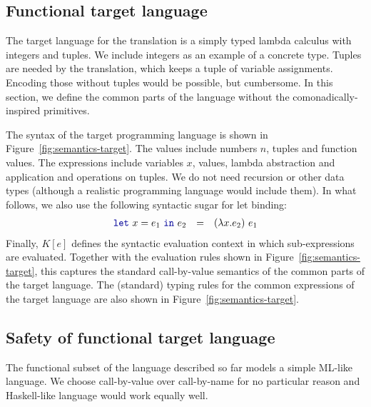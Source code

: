 
\subsection{Functional target language}
\label{sec:semantics-translation-target}

The target language for the translation is a simply typed lambda calculus with integers and tuples.
We include integers as an example of a concrete type. Tuples are needed by the translation, which
keeps a tuple of variable assignments. Encoding those without tuples would be possible, but
cumbersome. In this section, we define the common parts of the language without the
comonadically-inspired primitives.

The syntax of the target programming language is shown in Figure~\ref{fig:semantics-target}.
The values include numbers $n$, tuples and function values. The expressions include variables $x$,
values, lambda abstraction and application and operations on tuples. We do not need recursion or
other data types (although a realistic programming language would include them).
In what follows, we also use the following syntactic sugar for let binding:
%
\begin{equation*}
\begin{array}{rcl}
  \kvd{let}~x=e_1~\kvd{in}~e_2 &=& (\lambda x.e_2)~e_1
\end{array}
\end{equation*}
%
Finally, $K[e]$ defines the syntactic evaluation context in which sub-expressions are evaluated.
Together with the evaluation rules shown in  Figure~\ref{fig:semantics-target}, this captures the
standard call-by-value semantics of the common parts of the target language. The (standard) typing rules
for the common expressions of the target language are also shown in Figure~\ref{fig:semantics-target}.


\subsection{Safety of functional target language}

The functional subset of the language described so far models a simple ML-like language. We
choose call-by-value over call-by-name for no particular reason and Haskell-like language would
work equally well.

